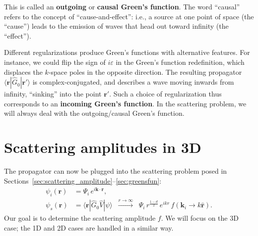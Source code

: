 \documentclass[pra,12pt]{revtex4}
\begin{document}
This is called an \textbf{outgoing} or \textbf{causal Green's
  function}.  The word ``causal'' refers to the concept of
``cause-and-effect'': i.e., a source at one point of space (the
``cause'') leads to the emission of waves that head out toward
infinity (the ``effect'').

Different regularizations produce Green's functions with alternative
features.  For instance, we could flip the sign of $i\varepsilon$ in
the Green's function redefinition, which displaces the $k$-space poles
in the opposite direction.  The resulting propagator
$\langle\mathbf{r}|\hat{G}_0|\mathbf{r}'\rangle$ is
complex-conjugated, and describes a wave moving inwards from infinity,
``sinking'' into the point $\mathbf{r}'$.  Such a choice of
regularization thus corresponds to an \textbf{incoming Green's
  function}.  In the scattering problem, we will always deal with the
outgoing/causal Green's function.

\section{Scattering amplitudes in 3D}
\label{sec:3damp}

The propagator can now be plugged into the scattering problem
posed in Sections~\ref{sec:scattering_amplitude}--\ref{sec:greensfun}:
$$\begin{aligned} \psi_i(\mathbf{r}) &= \Psi_i \, e^{i\mathbf{k}\cdot\mathbf{r}}, \\ \psi_s(\mathbf{r}) &= \langle\mathbf{r}| \hat{G}_0 \hat{V} |\psi\rangle \;\; \overset{r\rightarrow\infty}{\longrightarrow}\;\; \Psi_i \, r^{\frac{1-d}{2}} \, e^{ikr} \, f(\mathbf{k}_i\rightarrow k\hat{\mathbf{r}}).
\end{aligned}$$
Our goal is to determine the scattering amplitude $f$.  We will focus
on the 3D case; the 1D and 2D cases are handled in a similar way.
\end{document}
